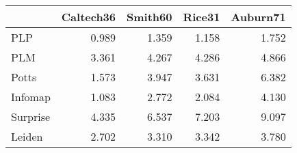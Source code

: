 \begin{tabular}{lrrrr}
\toprule
{} & Caltech36 & Smith60 & Rice31 & Auburn71 \\
\midrule
PLP      &     0.989 &   1.359 &  1.158 &    1.752 \\
PLM      &     3.361 &   4.267 &  4.286 &    4.866 \\
Potts    &     1.573 &   3.947 &  3.631 &    6.382 \\
Infomap  &     1.083 &   2.772 &  2.084 &    4.130 \\
Surprise &     4.335 &   6.537 &  7.203 &    9.097 \\
Leiden   &     2.702 &   3.310 &  3.342 &    3.780 \\
\bottomrule
\end{tabular}
